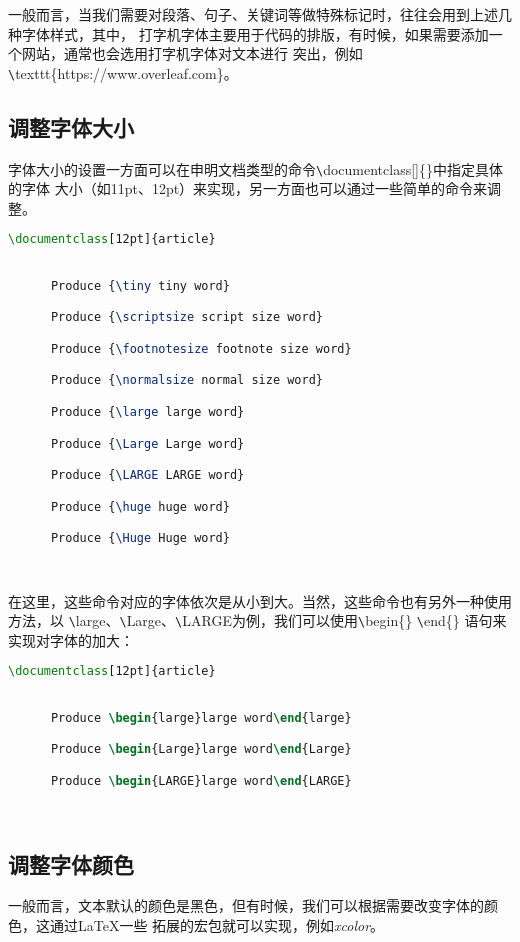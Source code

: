{一般而言，当我们需要对段落、句子、关键词等做特殊标记时，往往会用到上述几种字体样式，其中，
打字机字体主要用于代码的排版，有时候，如果需要添加一个网站，通常也会选用打字机字体对文本进行
突出，例如\verb|\|texttt\{https://www.overleaf.com\}。

\subsection{调整字体大小}
字体大小的设置一方面可以在申明文档类型的命令\verb|\|documentclass[]\{\}中指定具体的字体
大小（如11pt、12pt）来实现，另一方面也可以通过一些简单的命令来调整。
\begin{lstlisting}[language=TeX]
      \documentclass[12pt]{article}
      

      Produce {\tiny tiny word}

      Produce {\scriptsize script size word}

      Produce {\footnotesize footnote size word}

      Produce {\normalsize normal size word}

      Produce {\large large word}

      Produce {\Large Large word}

      Produce {\LARGE LARGE word}

      Produce {\huge huge word}

      Produce {\Huge Huge word}

      
\end{lstlisting}

在这里，这些命令对应的字体依次是从小到大。当然，这些命令也有另外一种使用方法，以
\verb|\|large、\verb|\|Large、\verb|\|LARGE为例，我们可以使用\verb|\|begin\{\} \verb|\|end\{\}
语句来实现对字体的加大：
\begin{lstlisting}[language=TeX]
      \documentclass[12pt]{article}
      

      Produce \begin{large}large word\end{large}

      Produce \begin{Large}large word\end{Large}

      Produce \begin{LARGE}large word\end{LARGE}

      
\end{lstlisting}

\subsection{调整字体颜色}
一般而言，文本默认的颜色是黑色，但有时候，我们可以根据需要改变字体的颜色，这通过LaTeX一些
拓展的宏包就可以实现，例如\emph{xcolor}。

}
